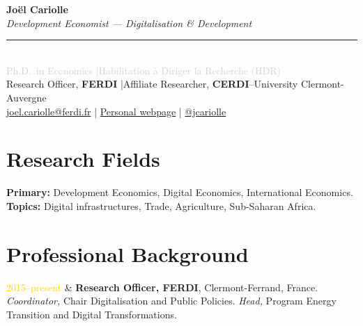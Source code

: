 \documentclass[11pt, a4paper]{article}
\makeatletter
\newenvironment{cvtable}{%
  \tabularx{\textwidth}{@{}p{2.8cm}@{\hspace{0.4cm}}>{\RaggedRight\arraybackslash}X@{}}%
}{\endtabularx}
\newcommand{\cvitem}[2]{%
  \begin{cvtable}
    \textcolor{gold}{\small #1} & #2 \\
  \end{cvtable}\par\vspace{-\parskip}\vspace{1pt}
}
\makeatother
\begin{document}
\thispagestyle{fancy}

\begin{center}
  {\LARGE\bfseries\color{navy} Jo\"{e}l Cariolle}\\[6pt]
  {\large\itshape\color{midgray} Development Economist --- Digitalisation \& Development}\\[6pt]
  \textcolor{gold}{\rule{0.5\linewidth}{0.6pt}}\\[6pt]
  \small
  \textcolor{lightgray}{Ph.D.\ in Economics \quad|\quad Habilitation \`{a} Diriger la Recherche (HDR)}\\[4pt]
  Research Officer, \textbf{FERDI} \quad|\quad Affiliate Researcher, \textbf{CERDI}--University Clermont-Auvergne\\[3pt]
  \href{mailto:joel.cariolle@ferdi.fr}{joel.cariolle@ferdi.fr}
  \quad|\quad
  \href{https://sites.google.com/view/joelcariolle}{Personal webpage}
  \quad|\quad
  \href{https://bsky.app/profile/joelcariolle.bsky.social}{@jcariolle}
\end{center}

\vspace{6pt}

\section{Research Fields}

\noindent\textbf{Primary:} Development Economics, Digital Economics, International Economics.\\
\medskip
\textbf{Topics:} Digital infrastructures, Trade, Agriculture, Sub-Saharan Africa.

\section{Professional Background}

\cvitem{2015--present}{%
  \textbf{Research Officer, FERDI}, Clermont-Ferrand, France.\newline
  \hspace*{1em}\textit{Coordinator,} Chair Digitalisation and Public Policies.\newline
  \hspace*{1em}\textit{Head,} Program Energy Transition and Digital Transformations.}
\end{document}
